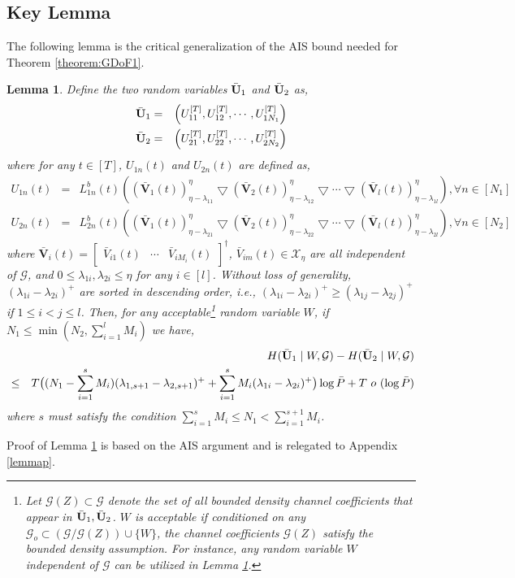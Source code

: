 \documentclass[11pt]{article}
\newtheorem{lemma}{Lemma}
\begin{document}
\subsection{ Key Lemma} 
The following  lemma is the critical generalization of the AIS bound needed for Theorem \ref{theorem:GDoF1}.
\begin{lemma}\label{lemma} Define the two random variables $\bar{\bf U}_1$ and  $\bar{\bf U}_2$ as,
\begin{eqnarray}
\bar{\bf U}_1&=&\left({U}_{11}^{[T]},{U}_{12}^{[T]},\cdots,{U}_{1N_1}^{[T]}\right)\label{lemmamimox1}\\
\bar{\bf U}_2&=&\left({U}_{21}^{[T]},{U}_{22}^{[T]},\cdots,{U}_{2N_2}^{[T]}\right)\label{lemmamimox2}
\end{eqnarray}
where for any $t\in[T]$, $U_{1n}(t)$ and $U_{2n}(t)$ are defined as,
\begin{eqnarray}
U_{1n}(t)&=&L_{1n}^b(t)\left((\bar{\mathbf{V}}_1(t))^{\eta}_{\eta-\lambda_{11}}\bigtriangledown(\bar{\mathbf{V}}_2(t))^{\eta}_{\eta-\lambda_{12}}\bigtriangledown\cdots\bigtriangledown(\bar{\mathbf{V}}_l(t))^{\eta}_{\eta-\lambda_{1l}}\right), \forall n\in[N_1]\label{lemmamimox3}\\
U_{2n}(t)&=&L_{2n}^b(t)\left((\bar{\mathbf{V}}_1(t))^{\eta}_{\eta-\lambda_{21}}\bigtriangledown(\bar{\mathbf{V}}_2(t))^{\eta}_{\eta-\lambda_{22}}\bigtriangledown\cdots\bigtriangledown(\bar{\mathbf{V}}_l(t))^{\eta}_{\eta-\lambda_{2l}}\right), \forall n\in[N_2]\label{lemmamimox4}
\end{eqnarray}
where $\bar{\mathbf{V}}_i(t)=\begin{bmatrix}\bar{V}_{i1}(t)&\cdots&\bar{V}_{iM_i}(t)\end{bmatrix}^\dagger$, $\bar{V}_{im}(t)\in\mathcal{X}_{\eta}$  are all independent of $\mathcal{G}$, and $0\le\lambda_{1i},\lambda_{2i}\le\eta$ for any $i\in[l]$.  Without loss of generality,  $(\lambda_{1i}-\lambda_{2i})^+$ are sorted in descending order, i.e., $(\lambda_{1i}-\lambda_{2i})^+\ge(\lambda_{1j}-\lambda_{2j})^+$ if $1\le i< j\le l$.  Then, for any acceptable\footnote{Let $\mathcal{G}(Z)\subset\mathcal{G}$ denote the set of all bounded density channel coefficients that appear in $\bar{\bf U}_1,\bar{\bf U}_2$.  $W$ is acceptable if  conditioned on any $\mathcal{G}_o\subset (\mathcal{G}/\mathcal{G}(Z))\cup \{W\}$, the channel coefficients $\mathcal{G}(Z)$ satisfy the bounded density assumption. For instance, any random variable $W$ independent of $\mathcal{G}$ can be utilized in  Lemma \ref{lemma}.} random variable ${W}$, if $N_1\le \min(N_2, \sum_{i=1}^lM_i)$ we have,
\begin{eqnarray}
&&H({\bar{\bf U}}_1\mid {W},\mathcal{G})-H({\bar{\bf U}}_2\mid {W},\mathcal{G})\nonumber\\
&\le&T\big((N_1-\sum_{i=1}^sM_i)(\lambda_{1,s+1}-\lambda_{2,s+1})^++\sum_{i=1}^sM_i(\lambda_{1i}-\lambda_{2i})^+\big)\log{\bar{P}}+T~o~(\log{\bar{P}})\label{lemmamimox5}
\end{eqnarray}
where $s$ must satisfy the condition  $\sum_{i=1}^{s}M_i\le N_1< \sum_{i=1}^{s+1}M_i$.  
\end{lemma} 
Proof of Lemma \ref{lemma} is based on the AIS argument and is relegated to Appendix \ref{lemmap}.
\end{document}
